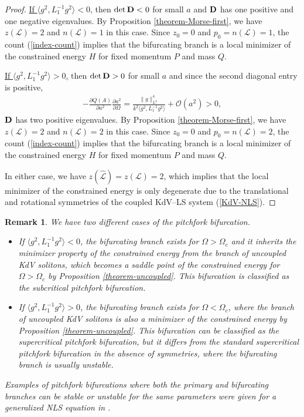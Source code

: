 \documentclass[12pt,reqno]{amsart}
\numberwithin{equation}{section}
\newtheorem{remark}{Remark}
\begin{document}
\begin{proof}
\underline{If $\langle g^2, L_1^{-1} g^2 \rangle < 0$,} then $\det {\bf D} < 0$ for small $a$ and ${\bf D}$ has one positive and one negative eigenvalues. 
By Proposition \ref{theorem-Morse-first}, we have $z(\mathcal{L}) = 2$ and $n(\mathcal{L}) = 1$ in this case. Since $z_0 = 0$ and $p_0 = n(\mathcal{L}) = 1$, the count (\ref{index-count}) implies that 
the bifurcating branch is a local minimizer of the constrained energy $H$ for fixed momentum $P$ and mass $Q$. 

\underline{If $\langle g^2, L_1^{-1} g^2 \rangle > 0$,} then $\det {\bf D} > 0$ for small $a$ and since the second diagonal entry is positive, 
\begin{align*}
    -\frac{\partial Q(A)}{\partial a^2} \frac{\partial a^2}{\partial \Omega} = \frac{\| g \|^4_{L^2}}{k^2 \langle g^2, L_1^{-1} g^2 \rangle} + \mathcal{O}(a^2) > 0,
\end{align*}
${\bf D}$ has two positive eigenvalues. By Proposition \ref{theorem-Morse-first}, we have $z(\mathcal{L}) = 2$ and $n(\mathcal{L}) = 2$ in this case. 
Since $z_0 = 0$ and $p_0 = n(\mathcal{L}) = 2$, the count (\ref{index-count}) implies that the bifurcating branch is a local minimizer of the constrained energy $H$ for fixed momentum $P$ and mass $Q$. 

In either case, we have $z(\hat{\mathcal{L}}) = z(\mathcal{L}) = 2$, 
which implies that the local minimizer of the constrained energy is only degenerate due to the translational and rotational 
symmetries of the coupled KdV--LS system (\ref{KdV-NLS}). 
\end{proof}

\begin{remark}
We have two different cases of the pitchfork bifurcation.
	\begin{itemize}
		\item If $\langle g^2, L_1^{-1} g^2 \rangle < 0$, the bifurcating branch exists for $\Omega > \Omega_c$ and it inherits 
the minimizer property of the constrained energy from the branch of uncoupled KdV solitons, which becomes a saddle point of the constrained energy for $\Omega > \Omega_c$ by Proposition \ref{theorem-uncoupled}. 
This bifurcation is classified as the subcritical pitchfork bifurcation.

\item If $\langle g^2, L_1^{-1} g^2 \rangle > 0$, the bifurcating branch exists for $\Omega < \Omega_c$, where the branch of uncoupled KdV solitons is also a minimizer of the constrained energy by Proposition \ref{theorem-uncoupled}. This bifurcation can be classified as the supercritical pitchfork bifurcation, 
but it differs from the standard supercritical pitchfork bifurcation in the absence of symmetries, where the bifurcating branch is usually unstable. 
	\end{itemize}
Examples of pitchfork bifurcations where both the primary and bifurcating branches can be stable or unstable for the same parameters were given 
for a generalized NLS equation in \cite{Yang}.
\label{rem-bifucations}
\end{remark}
\end{document}
